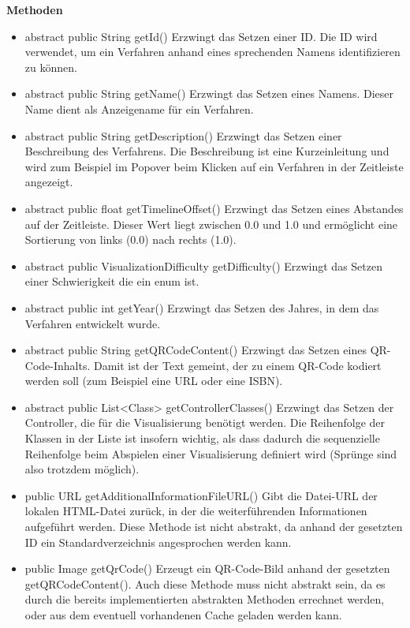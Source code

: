 \documentclass{article}
\begin{document}
      \textbf{Methoden}
      \begin{itemize}
        \item abstract public String getId() \newline
          Erzwingt das Setzen einer ID. Die ID wird verwendet, um ein Verfahren anhand
          eines sprechenden Namens identifizieren zu können.
        \item abstract public String getName() \newline
          Erzwingt das Setzen eines Namens. Dieser Name dient als Anzeigename für ein
          Verfahren.
        \item abstract public String getDescription() \newline
          Erzwingt das Setzen einer Beschreibung des Verfahrens. Die Beschreibung ist
          eine Kurzeinleitung und wird zum Beispiel im Popover beim Klicken auf ein
          Verfahren in der Zeitleiste angezeigt.
        \item abstract public float getTimelineOffset() \newline
          Erzwingt das Setzen eines Abstandes auf der Zeitleiste. Dieser Wert liegt
          zwischen 0.0 und 1.0 und ermöglicht eine Sortierung von links (0.0) nach rechts (1.0).
        \item abstract public VisualizationDifficulty getDifficulty() \newline
          Erzwingt das Setzen einer Schwierigkeit die ein enum ist.
        \item abstract public int getYear() \newline
          Erzwingt das Setzen des Jahres, in dem das Verfahren entwickelt wurde.
        \item abstract public String getQRCodeContent() \newline
          Erzwingt das Setzen eines QR-Code-Inhalts. Damit ist der Text gemeint, der
          zu einem QR-Code kodiert werden soll (zum Beispiel eine URL oder eine ISBN).
        \item abstract public List<Class> getControllerClasses() \newline
          Erzwingt das Setzen der Controller, die für die Visualisierung benötigt werden.
          Die Reihenfolge der Klassen in der Liste ist insofern wichtig, als dass dadurch
		  die sequenzielle Reihenfolge beim Abspielen einer Visualisierung definiert wird 
		  (Sprünge sind also trotzdem möglich).
        \item public URL getAdditionalInformationFileURL() \newline
          Gibt die Datei-URL der lokalen HTML-Datei zurück, in der die weiterführenden
          Informationen aufgeführt werden. Diese Methode ist nicht abstrakt, da anhand
          der gesetzten ID ein Standardverzeichnis angesprochen werden kann.
        \item public Image getQrCode() \newline
          Erzeugt ein QR-Code-Bild anhand der gesetzten getQRCodeContent(). Auch diese Methode
          muss nicht abstrakt sein, da es durch die bereits implementierten abstrakten Methoden
          errechnet werden, oder aus dem eventuell vorhandenen Cache geladen werden kann.
      \end{itemize}
\end{document}
